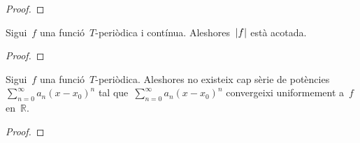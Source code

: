 \documentclass[../analisi-matematica.tex]{subfiles}
\begin{document}
    \begin{proof}
    \end{proof}
    \begin{lemma}
        \label{lema:les-funciones-periodiques-i-continues-estan-acotades}
        Sigui~\(f\) una funció~\(T\)-periòdica i contínua.
        Aleshores~\(\abs{f}\) està acotada.
    \end{lemma}
    \begin{proof}
    \end{proof}
    \begin{lemma}
        \label{lema:les-funcions-periodiques-no-poden-ser-aproximades-per-una-serie-de-potencies}
        Sigui~\(f\) una funció~\(T\)-periòdica.
        Aleshores no existeix cap sèrie de potències~\(\sum_{n=0}^{\infty}a_{n}(x-x_{0})^{n}\) tal que~\(\sum_{n=0}^{\infty}a_{n}(x-x_{0})^{n}\) convergeixi uniformement a~\(f\) en~\(\mathbb{R}\).
    \end{lemma}
    \begin{proof}
    \end{proof}
\end{document}
